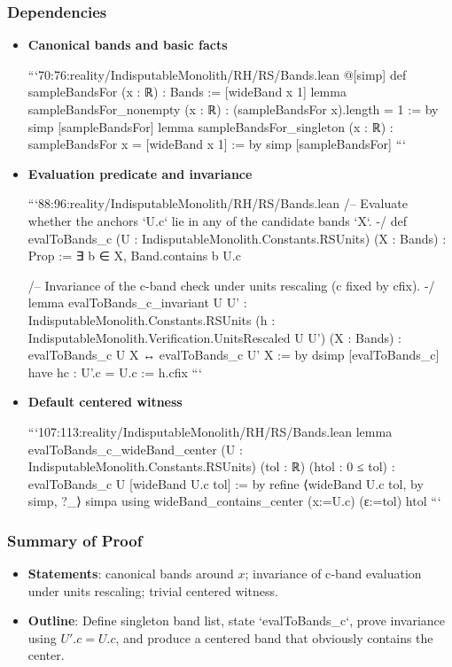 \documentclass{article}
\begin{document}
\subsubsection{Dependencies}
\begin{itemize}[leftmargin=*]
  \item \textbf{Canonical bands and basic facts}

```70:76:reality/IndisputableMonolith/RH/RS/Bands.lean
@[simp] def sampleBandsFor (x : ℝ) : Bands := [wideBand x 1]
lemma sampleBandsFor_nonempty (x : ℝ) : (sampleBandsFor x).length = 1 := by
  simp [sampleBandsFor]
lemma sampleBandsFor_singleton (x : ℝ) : sampleBandsFor x = [wideBand x 1] := by
  simp [sampleBandsFor]
```

  \item \textbf{Evaluation predicate and invariance}

```88:96:reality/IndisputableMonolith/RH/RS/Bands.lean
/-- Evaluate whether the anchors `U.c` lie in any of the candidate bands `X`. -/
 def evalToBands_c (U : IndisputableMonolith.Constants.RSUnits) (X : Bands) : Prop :=
  ∃ b ∈ X, Band.contains b U.c

/-- Invariance of the c-band check under units rescaling (c fixed by cfix). -/
 lemma evalToBands_c_invariant {U U' : IndisputableMonolith.Constants.RSUnits}
  (h : IndisputableMonolith.Verification.UnitsRescaled U U') (X : Bands) :
  evalToBands_c U X ↔ evalToBands_c U' X := by
  dsimp [evalToBands_c]
  have hc : U'.c = U.c := h.cfix
```

  \item \textbf{Default centered witness}

```107:113:reality/IndisputableMonolith/RH/RS/Bands.lean
lemma evalToBands_c_wideBand_center
  (U : IndisputableMonolith.Constants.RSUnits) (tol : ℝ) (htol : 0 ≤ tol) :
  evalToBands_c U [wideBand U.c tol] := by
  refine ⟨wideBand U.c tol, by simp, ?_⟩
  simpa using wideBand_contains_center (x:=U.c) (ε:=tol) htol
```
\end{itemize}

\subsubsection{Summary of Proof}
\begin{itemize}[leftmargin=*]
  \item \textbf{Statements}: canonical bands around \(x\); invariance of c‑band evaluation under units rescaling; trivial centered witness.
  \item \textbf{Outline}: Define singleton band list, state `evalToBands_c`, prove invariance using \(U'.c=U.c\), and produce a centered band that obviously contains the center.
\end{itemize}
\end{document}

